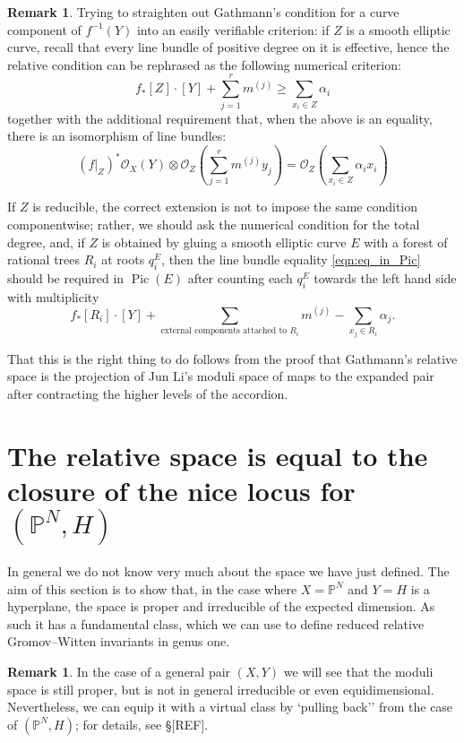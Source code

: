 \documentclass[11pt]{amsart}
\newcommand{\PP}{\mathbb P}
\newcommand{\OO}{\mathcal{O}}
\newcommand{\Pic}{\operatorname{Pic}}
\theoremstyle{definition}
\theoremstyle{definition}
\newtheorem{remark}[thm]{Remark}
\begin{document}
\begin{remark}
Trying to straighten out Gathmann's condition for a curve component of $f^{-1}(Y)$ into an easily verifiable criterion: if $Z$ is a smooth elliptic curve, recall that every line bundle of positive degree on it is effective, hence the relative condition can be rephrased as the following numerical criterion:
\begin{equation*} f_*[Z]\cdot [Y]+\sum_{j=1}^r m^{(j)}\geq \sum_{x_i\in Z}\alpha_i \end{equation*}
together with the additional requirement that, when the above is an equality, there is an isomorphism of line bundles:
\begin{equation}\label{eqn:eq_in_Pic}
(f|_{Z})^*\OO_X(Y) \otimes \OO_Z\left(\sum_{j=1}^r m^{(j)}y_j\right)=\OO_Z\left(\sum_{x_i\in Z}\alpha_ix_i\right) 
\end{equation}
 
 If $Z$ is reducible, the correct extension is not to impose the same condition componentwise; rather, we should ask the numerical condition for the total degree, and, if $Z$ is obtained by gluing a smooth elliptic curve $E$ with a forest of rational trees $R_i$ at roots $q^E_i$, then the line bundle equality \eqref{eqn:eq_in_Pic} should be required in $\Pic(E)$ after counting each $q^E_i$ towards the left hand side with multiplicity
 \[f_*[R_i]\cdot [Y]+\sum_{\text{external components attached to $R_i$}} m^{(j)}- \sum_{x_j\in R_i}\alpha_j.\]
 
 That this is the right thing to do follows from the proof that Gathmann's relative space is the projection of Jun Li's moduli space of maps to the expanded pair after contracting the higher levels of the accordion.
\end{remark}

\section{The relative space is equal to the closure of the nice locus for $(\PP^N,H)$}
\noindent In general we do not know very much about the space we have just defined. The aim of this section is to show that, in the case where $X=\PP^N$ and $Y=H$ is a hyperplane, the space is proper and irreducible of the expected dimension. As such it has a fundamental class, which we can use to define reduced relative Gromov--Witten invariants in genus one.

\begin{remark} In the case of a general pair $(X,Y)$ we will see that the moduli space is still proper, but is not in general irreducible or even equidimensional. Nevertheless, we can equip it with a virtual class by `pulling back'' from the case of $(\PP^N,H)$; for details, see \S [REF]. \end{remark}
\end{document}
